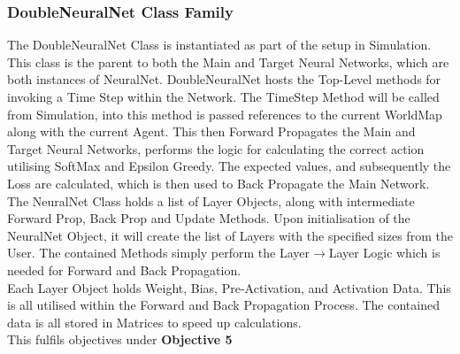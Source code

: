 \begin{flushleft}
            \subsubsection{DoubleNeuralNet Class Family}
                The DoubleNeuralNet Class is instantiated as part of the setup in Simulation. This class is the parent to both the Main and Target 
                Neural Networks, which are both instances of NeuralNet. DoubleNeuralNet hosts the Top-Level methods for invoking a Time Step
                within the Network. The TimeStep Method will be called from Simulation, into this method is passed references to the current WorldMap
                along with the current Agent. This then Forward Propagates the Main and Target Neural Networks, performs the logic for calculating the
                correct action utilising SoftMax and Epsilon Greedy. The expected values, and subsequently the Loss are calculated, which is then used
                to Back Propagate the Main Network. \\
                \vspace{0.2cm}
                The NeuralNet Class holds a list of Layer Objects, along with intermediate Forward Prop, Back Prop and Update Methods. Upon initialisation
                of the NeuralNet Object, it will create the list of Layers with the specified sizes from the User. The contained Methods simply perform
                the Layer$\to$Layer Logic which is needed for Forward and Back Propagation. \\
                \vspace{0.2cm}
                Each Layer Object holds Weight, Bias, Pre-Activation, and Activation Data. This is all utilised within the Forward and Back Propagation 
                Process. The contained data is all stored in Matrices to speed up calculations. \\
                \vspace{0.2cm}
                This fulfils objectives under \textbf{Objective 5} \\


\end{flushleft}
